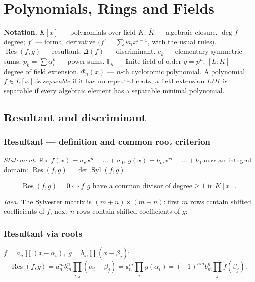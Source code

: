 \chapter{Polynomials, Rings and Fields}
\label{ch:polynoms}

\medskip

\textbf{Notation.} $K[x]$ --- polynomials over field $K$; $\overline{K}$ --- algebraic closure.
$\deg f$ --- degree; $f'$ --- formal derivative $\bigl(f'=\sum i a_i x^{i-1}$, with the usual rules$\bigr)$.
$\operatorname{Res}(f,g)$ --- resultant; $\Delta(f)$ --- discriminant.
$e_k$ --- elementary symmetric sums; $p_k=\sum\alpha_i^k$ --- power sums.
$\mathbb{F}_q$ --- finite field of order $q=p^n$.
$[L:K]$ --- degree of field extension.
$\Phi_n(x)$ --- $n$-th cyclotomic polynomial.
A polynomial $f\in L[x]$ is \textit{separable} if it has no repeated roots; a field extension $L/K$ is separable if every algebraic element has a separable minimal polynomial.

\medskip

\section{Resultant and discriminant}
\label{sec:resultant-discriminant}

\subsection{Resultant --- definition and common root criterion}
\label{subsec:resultant-def}

\textit{Statement.} For $f(x)=a_nx^n+\dots+a_0,\;g(x)=b_mx^m+\dots+b_0$ over an integral domain: $\operatorname{Res}(f,g)=\det\operatorname{Syl}(f,g)$.

$$\operatorname{Res}(f,g)=0 \iff f,g\text{ have a common divisor of degree}\ge 1\text{ in }\overline{K}[x].$$

\textit{Idea.} The Sylvester matrix is $(m+n)\times(m+n)$: first $m$ rows contain shifted coefficients of $f$, next $n$ rows contain shifted coefficients of $g$:

\subsection{Resultant via roots}
\label{subsec:resultant-roots}

$f=a_n\prod(x-\alpha_i),\;g=b_m\prod(x-\beta_j)$:
$$\operatorname{Res}(f,g)=a_n^m b_m^n\prod_{i,j}(\alpha_i-\beta_j)=a_n^m\prod_i g(\alpha_i)=(-1)^{nm}b_m^n\prod_j f(\beta_j).$$

